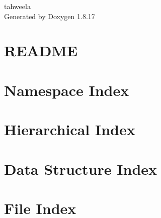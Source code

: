 \let\mypdfximage\pdfximage\def\pdfximage{\immediate\mypdfximage}\documentclass[twoside]{book}
\newcommand{\+}{\discretionary{\mbox{\scriptsize$\hookleftarrow$}}{}{}}
\newcommand{\clearemptydoublepage}{%
  \newpage{\pagestyle{empty}\cleardoublepage}%
}
\begin{document}
\hypersetup{pageanchor=false,
             bookmarksnumbered=true,
             pdfencoding=unicode
            }
\begin{titlepage}
\vspace*{7cm}
\begin{center}%
{\Large tahweela }\\
\vspace*{1cm}
{\large Generated by Doxygen 1.8.17}\\
\end{center}
\end{titlepage}
\clearemptydoublepage
{}
\tableofcontents
\clearemptydoublepage
{}
\hypersetup{pageanchor=true}

\chapter{R\+E\+A\+D\+ME}
\label{md__r_e_a_d_m_e}

\chapter{Namespace Index}

\chapter{Hierarchical Index}

\chapter{Data Structure Index}

\chapter{File Index}

\end{document}
